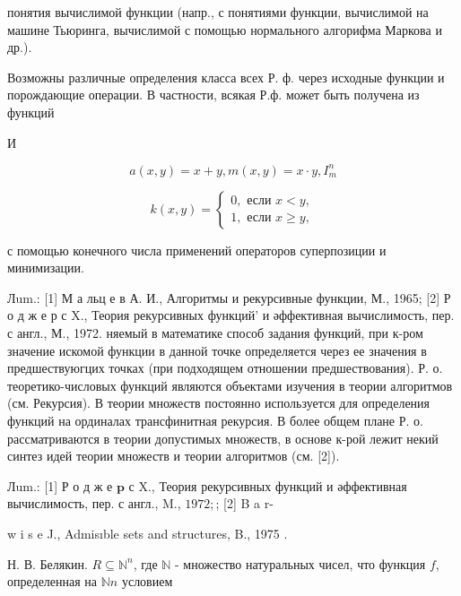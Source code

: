 \documentclass[10pt]{article}
\begin{document}
понятия вычислимой функции (напр., с понятиями функции, вычислимой на машине Тьюринга, вычислимой с помощью нормального алгорифма Маркова и др.).



Возможны различные определения класса всех Р. ф. через исходные функции и порождающие операции. В частности, всякая Р.ф. может быть получена из функций



И



\[

a(x, y)=x+y, m(x, y)=x \cdot y, I_{m}^{n}

\]



\[

k(x, y)=\left\{\begin{array}{l}

0, \text { если } x<y, \\

1, \text { если } x \geqslant y,

\end{array}\right.

\]



с помощью конечного числа применений операторов суперпозиции и минимизации.



Лum.: [1] М а льц е в А. И., Алгоритмы и рекурсивные функции, М., 1965; [2] Р о д ж е р с X., Теория рекурсивных функций' и әффективная вычислимость, пер. с англ., М., 1972. няемый в математике способ задания функций, при к-ром значение искомой функции в данной точке определяется через ее значения в предшествуюгцих точках (при подходящем отношении предшествования). Р. о. теоретико-числовых функций являются объектами изучения в теории алгоритмов (см. Рекурсия). В теории множеств постоянно используется для определения функций на ординалах трансфинитная рекурсия. В более общем плане Р. о. рассматриваются в теории допустимых множеств, в основе к-рой лежит некий синтез идей теории множеств и теории алгоритмов (см. [2]).



Лum.: [1] Р о д ж е $\mathbf{p}$ с X., Теория рекурсивных функций и әффективная вычислимость, пер. с англ., M., $1972 ;$; [2] B a r-

w i s e J., Admisıble sets and structures, B., 1975 .



Н. В. Белякин. $R \subseteq \mathbb{N}^{n}$, где $\mathbb{N}$ - множество натуральных чисел, что функция $f$, определенная на $\mathbb{N} n$ условием
\end{document}
